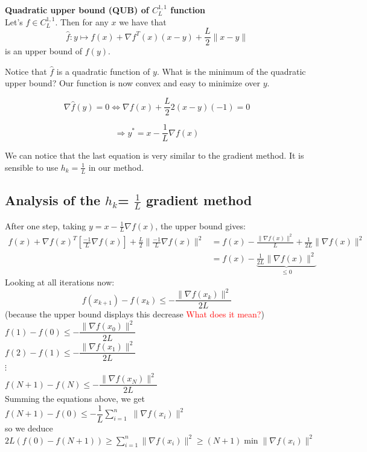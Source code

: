 \begin{lemma}
\textbf{Quadratic upper bound (QUB) of $C_L^{1,1}$ function} \\
Let's $f \in C_L^{1,1}$. Then for any $x$ we have that 
$$ \hat{f}: y \mapsto  f(x)+ \nabla f^T(x)(x-y)+ \frac{L}{2} \| x-y\| $$
 is an upper bound of $f(y)$.
\end{lemma}

Notice that $\hat{f}$ is a quadratic function of $y$.  What is the minimum of the quadratic upper bound? Our function is now convex and easy to minimize over $y$.


$$\nabla \hat{f}(y)=0 \Leftrightarrow  \nabla f(x) +\frac{L}{2} 2(x-y)(-1)=0$$

$$ \Rightarrow y^{*} = x- \frac{1}{L} \nabla f(x)$$

We can notice that the last equation is very similar to the gradient method. It is sensible to use $h_k=\frac{1}{L}$ in our method. 

\subsection{Analysis of the $h_{k}$= $\frac{1}{L}$ gradient method}
 
After one step, taking  $y= x-\frac{1}{L}\nabla f(x)$, the upper bound gives:
\begin{align*}
f(x) + \nabla f(x)^{T} [\frac{-1}{L} \nabla f(x)]+\frac{L}{2} \|  \frac{-1}{L}\nabla f(x)\|^2
& =f(x)- \frac{\|\nabla f(x)\|^{2}}{L}+\frac{1}{2L} \|\nabla f(x)\|^{2} \\
& =f(x)-\underbrace{\frac{1}{2L} \|\nabla f(x)\|^{2}}_{\leq 0}
\end{align*}
Looking at all iterations now:
$$ f(x_{k+1})-f(x_{k}) \leq - \frac{\|\nabla f(x_k)\|^{2}}{2L}$$
(because the upper bound displays this decrease \textcolor{red}{What does it mean?})\\


$f(1)-f(0) \leq -\dfrac{\|\nabla f(x_{0})\|^{2}}{2L}$\\
$f(2)-f(1) \leq -\dfrac{\|\nabla f(x_{1})\|^{2}}{2L}$ \\
$\vdots$ \\
$f(N+1)-f(N) \leq -\dfrac{\|\nabla f(x_{N})\|^{2}}{2L}$\\

Summing the equations above, we get \\
$f(N+1)-f(0) \leq - \dfrac{1}{L} \sum\limits_{i=1}^{n}$ $\|\nabla f(x_{i})\|^{2}$\\
so we deduce \\
$2L(f(0)-f(N+1)) \geq \sum\limits_{i=1}^{n} \|\nabla f(x_{i})\|^{2} \geq (N+1) \min \|\nabla f(x_{i})\|^{2}$

